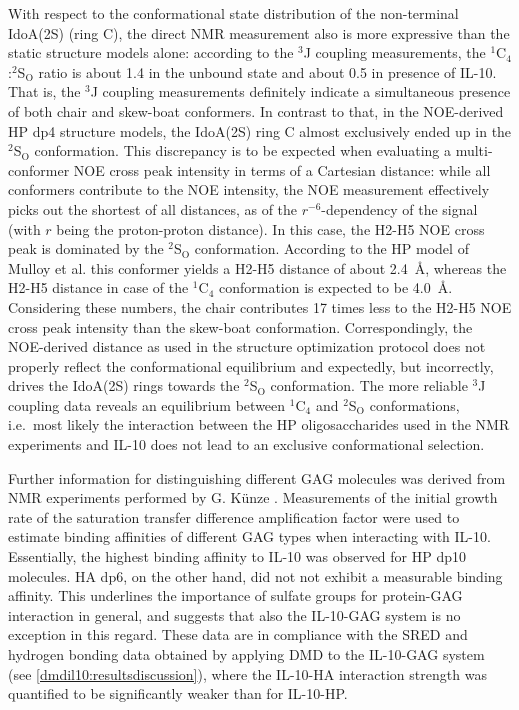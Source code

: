With respect to the conformational state distribution of the non-terminal
IdoA(2S) (ring C), the direct NMR measurement also is more expressive than the
static structure models alone: according to the ${}^{3}$J coupling measurements,
the ${}^1$C${}_4$:${}^2$S${}_\mathrm{O}$ ratio is about 1.4 in the unbound state
and about 0.5 in presence of IL-10. That is, the ${}^{3}$J coupling measurements
definitely indicate a simultaneous presence of both chair and skew-boat
conformers. In contrast to that, in the NOE-derived HP dp4 structure models, the
IdoA(2S) ring C almost exclusively ended up in the  ${}^2$S${}_\mathrm{O}$
conformation. This discrepancy is to be expected when evaluating a
multi-conformer NOE cross peak intensity in terms of a Cartesian distance: while
all conformers contribute to the NOE intensity, the NOE measurement effectively
picks out the shortest of all distances, as of the $r^{-6}$-dependency of the
signal (with $r$ being the proton-proton distance). In this case, the H2-H5 NOE
cross peak is dominated by the ${}^2$S${}_\mathrm{O}$ conformation. According to
the HP model of Mulloy et al. \cite{foster_mulloy_1993} this conformer yields a
H2-H5 distance of about \SI{2.4}{\angstrom}, whereas the H2-H5 distance in case
of the ${}^1$C${}_4$ conformation is expected to be \SI{4.0}{\angstrom}.
Considering these numbers, the chair contributes 17 times less to the H2-H5 NOE
cross peak intensity than the skew-boat conformation. Correspondingly, the
NOE-derived distance as used in the structure optimization protocol does not
properly reflect the conformational equilibrium and expectedly, but incorrectly,
drives the IdoA(2S) rings towards the ${}^2$S${}_\mathrm{O}$ conformation. The
more reliable ${}^{3}$J coupling data reveals an equilibrium between
${}^1$C${}_4$ and ${}^2$S${}_\mathrm{O}$ conformations, i.e.\ most likely the
interaction between the HP oligosaccharides used in the NMR experiments and
IL-10 does not lead to an exclusive conformational selection.

Further information for distinguishing different GAG molecules was derived from
NMR experiments performed by G. Künze \cite{kuenze_gehrcke_2014}. Measurements
of the initial growth rate of the saturation transfer difference amplification
factor were used to estimate binding affinities of different GAG types when
interacting with IL-10. Essentially, the highest binding affinity to IL-10 was
observed for HP dp10 molecules. HA dp6, on the other hand, did not not exhibit a
measurable binding affinity. This underlines the importance of sulfate groups
for protein-GAG interaction in general, and suggests that also the IL-10-GAG
system is no exception in this regard. These data are in compliance with the
SRED and hydrogen bonding data obtained by applying DMD to the IL-10-GAG system
(see \cref{dmdil10:resultsdiscussion}), where the IL-10-HA interaction strength
was quantified to be significantly weaker than for IL-10-HP.

